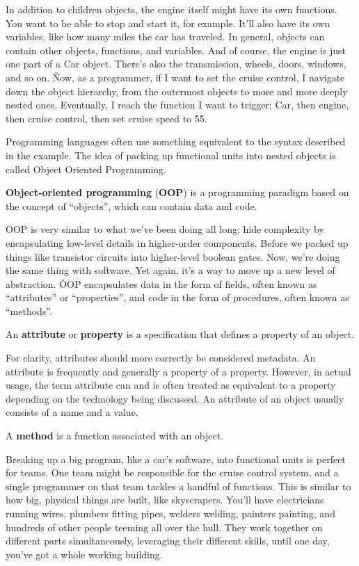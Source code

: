 In addition to children objects, the engine itself might have its own functions. You want to be able to stop and
start it, for example. It'll also have its own variables, like how many miles the car has traveled. In general,
objects can contain other objects, functions, and variables. And of course, the engine is just one part of a Car
object. There's also the transmission, wheels, doors, windows, and so on. \v

Now, as a programmer, if I want to set the cruise control, I navigate down the object hierarchy, from the outermost
objects to more and more deeply nested ones. Eventually, I reach the function I want to trigger: Car, then engine,
then cruise control, then set cruise speed to 55.
\ee

Programming languages often use something equivalent to the syntax described in the example. The idea of packing up
functional units into nested objects is called Object Oriented Programming.

\textbf{Object-oriented programming} (\textbf{OOP}) is a programming paradigm based on the concept of ``objects'',
which can contain data and code.
\ed

OOP is very similar to what we've been doing all long: hide complexity by encapsulating low-level details in
higher-order components. Before we packed up things like transistor circuits into higher-level boolean gates. Now,
we're doing the same thing with software. Yet again, it's a way to move up a new level of abstraction. \v

OOP encapsulates data in the form of fields, often known as ``attributes'' or ``properties'', and code in the form of
procedures, often known as ``methods''.

An \textbf{attribute} or \textbf{property} is a specification that defines a property of an object.
\ed

For clarity, attributes should more correctly be considered metadata. An attribute is frequently and generally a
property of a property. However, in actual usage, the term attribute can and is often treated as equivalent to a
property depending on the technology being discussed. An attribute of an object usually consists of a name and a value.

\bd[Method]
A \textbf{method} is a function associated with an object.
\ed

Breaking up a big program, like a car's software, into functional units is perfect for teams. One team might be
responsible for the cruise control system, and a single programmer on that team tackles a handful of functions. This
is similar to how big, physical things are built, like skyscrapers. You'll have electricians running wires, plumbers
fitting pipes, welders welding, painters painting, and hundreds of other people teeming all over the hull. They work
together on different parts simultaneously, leveraging their different skills, until one day, you've got a whole
working building.

